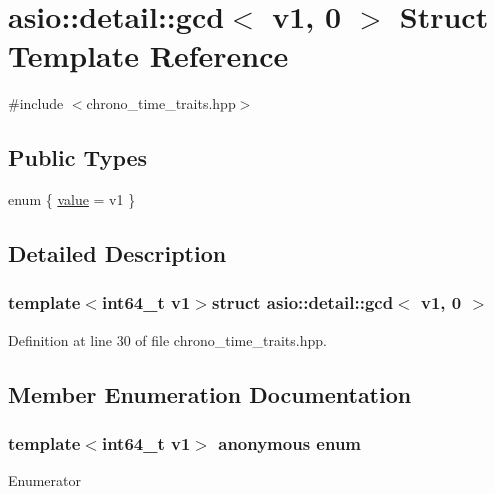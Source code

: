 \hypertarget{structasio_1_1detail_1_1gcd_3_01v1_00_010_01_4}{}\section{asio\+:\+:detail\+:\+:gcd$<$ v1, 0 $>$ Struct Template Reference}
\label{structasio_1_1detail_1_1gcd_3_01v1_00_010_01_4}


{\ttfamily \#include $<$chrono\+\_\+time\+\_\+traits.\+hpp$>$}

\subsection*{Public Types}
\begin{DoxyCompactItemize}
\item 
enum \{ \hyperlink{structasio_1_1detail_1_1gcd_3_01v1_00_010_01_4_a5759d8e3df09ffa610b3b5485b002a0ea08105f221a988f57540225dc5d35b356}{value} = v1
 \}
\end{DoxyCompactItemize}


\subsection{Detailed Description}
\subsubsection*{template$<$int64\+\_\+t v1$>$struct asio\+::detail\+::gcd$<$ v1, 0 $>$}



Definition at line 30 of file chrono\+\_\+time\+\_\+traits.\+hpp.



\subsection{Member Enumeration Documentation}
\hypertarget{structasio_1_1detail_1_1gcd_3_01v1_00_010_01_4_a5759d8e3df09ffa610b3b5485b002a0e}{}\subsubsection[{anonymous enum}]{\setlength{\rightskip}{0pt plus 5cm}template$<$int64\+\_\+t v1$>$ anonymous enum}\label{structasio_1_1detail_1_1gcd_3_01v1_00_010_01_4_a5759d8e3df09ffa610b3b5485b002a0e}
\begin{Desc}
\item[Enumerator]\par
\begin{description}
\item[{\em 
\hypertarget{structasio_1_1detail_1_1gcd_3_01v1_00_010_01_4_a5759d8e3df09ffa610b3b5485b002a0ea08105f221a988f57540225dc5d35b356}{}value\label{structasio_1_1detail_1_1gcd_3_01v1_00_010_01_4_a5759d8e3df09ffa610b3b5485b002a0ea08105f221a988f57540225dc5d35b356}
}]\end{description}
\end{Desc}


